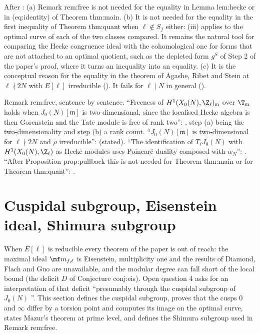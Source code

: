 \begin{remark}\label{rem:moddeg:rem-free-after-39}
After : (a) Remark rem:free is not needed for the equality in Lemma lem:hecke or in (eq:identity) of Theorem thm:main. (b) It is not needed
for the equality in the first inequality of Theorem thm:quant when $\ell\notin S_f$ either: (iii) applies to the optimal curve of each of the two classes compared. It
remains the natural tool for comparing the Hecke congruence ideal with the cohomological one for forms that are not attached to an optimal quotient, such as the depleted form $g^S$ of Step 2
of the paper's proof, where it turns an inequality into an equality. (c) It is the conceptual reason for the equality in the theorem of Agashe, Ribet and Stein at $\ell\nmid2N$ with $E[\ell]$
irreducible (). It fails for $\ell\mid N$ in general ().
\end{remark}

\begin{paperlink}\label{pl:moddeg:rem-free}
Remark rem:free, sentence by sentence. ``Freeness of $H^1(X_0(N),\Z_\ell)_{\mathfrak m}$ over $\T_{\mathfrak m}$ holds when $J_0(N)[\mathfrak m]$ is two-dimensional, since the localised Hecke algebra is then
Gorenstein and the Tate module is free of rank two'': , step (a) being the two-dimensionality and step (b) a rank count. ``$J_0(N)[\mathfrak m]$ is two-dimensional for
$\ell\nmid2N$ and $\bar\rho$ irreducible'':  (stated). ``The identification of $T_\ell J_0(N)$ with $H^1(X_0(N),\Z_\ell)$ as Hecke modules uses Poincar\'e duality
composed with $w_N$'': . ``After Proposition prop:pullback this is not needed for Theorem thm:main or for Theorem thm:quant'': .
\end{paperlink}

\section{Cuspidal subgroup, Eisenstein ideal, Shimura subgroup}\label{sec:moddeg:eisenstein}

When $E[\ell]$ is reducible every theorem of the paper is out of reach: the maximal ideal $\mf m_{f,\ell}$ is Eisenstein, multiplicity one and the results of Diamond, Flach and Guo are
unavailable, and the modular degree can fall short of the local bound (the deficit $D$ of Conjecture conj:eis). Open question 4 asks for an interpretation of that deficit ``presumably
through the cuspidal subgroup of $J_0(N)$ \cite{Mazur77}''. This section defines the cuspidal subgroup, proves that the cusps $0$ and $\infty$ differ by a torsion point and computes its
image on the optimal curve, states Mazur's theorem at prime level, and defines the Shimura subgroup used in Remark rem:free.

